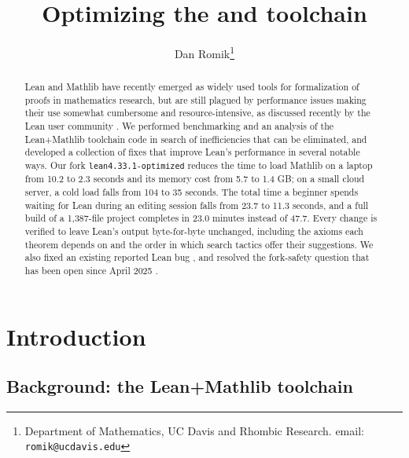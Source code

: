 \documentclass{article}
\title{Optimizing the \Lean and \mathlib toolchain}
\author{Dan Romik\footnote{Department of Mathematics, UC Davis and Rhombic Research. email: \texttt{romik@ucdavis.edu}}}
\newcommand{\Lean}{Lean\xspace}      %
\newcommand{\mathlib}{Mathlib\xspace}
\newcommand{\altlean}{\texttt{lean4.33.1-\allowbreak optimized}\xspace}
\begin{document}
\maketitle

\begin{abstract}
\Lean and \mathlib have recently emerged as widely used tools for formalization of proofs in mathematics research, but are still plagued by performance issues making their use somewhat cumbersome and resource-intensive, as discussed recently by the \Lean user community \cite{zulip-vscode-startup,zulip-unusably-slow}. We performed benchmarking and an analysis of the \Lean{}+\mathlib toolchain code in search of inefficiencies that can be eliminated, and developed a collection of fixes that improve \Lean's performance in several notable ways. Our fork \altlean reduces the time to load \mathlib on a laptop from 10.2 to 2.3 seconds and its memory cost from 5.7 to 1.4 GB; on a small cloud server, a cold load falls from 104 to 35 seconds. The total time a beginner spends waiting for Lean during an editing session falls from 23.7 to 11.3 seconds, and a full build of a 1,387-file project completes in 23.0 minutes instead of 47.7. Every change is verified to leave \Lean's output byte-for-byte unchanged, including the axioms each theorem depends on and the order in which search tactics offer their suggestions. We also fixed an existing reported \Lean bug \cite{lean14359}, and resolved the fork-safety question that has been open since April 2025 \cite{repl87,repl84}.
\end{abstract}

\section{Introduction}

\subsection{Background: the Lean+Mathlib toolchain}
\label{sec:intro-toolchain}
\end{document}
